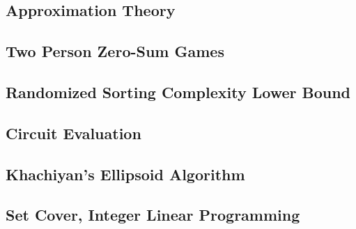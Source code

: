 \documentclass[10pt]{article}
\theoremstyle{plain}
\theoremstyle{definition}
\numberwithin{equation}{section}
\numberwithin{figure}{section}
\begin{document}
\subsection{Approximation Theory}

\subsection{Two Person Zero-Sum Games}

\subsection{Randomized Sorting Complexity Lower Bound}

\subsection{Circuit Evaluation}

\subsection{Khachiyan's Ellipsoid Algorithm}

\subsection{Set Cover, Integer Linear Programming}
\end{document}
